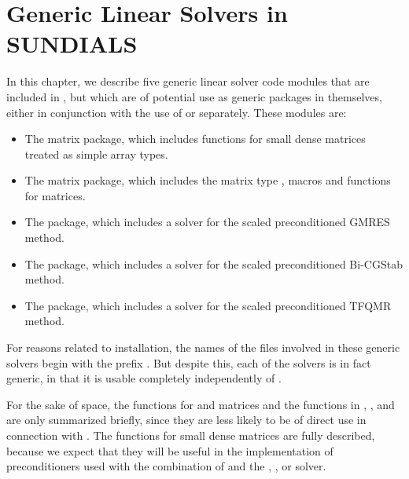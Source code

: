 \chapter{Generic Linear Solvers in SUNDIALS}\label{s:gen_linsolv}
In this chapter, we describe five generic linear solver code modules that 
are included in {\sundials}, but which are of potential use as generic packages in
themselves, either in conjunction with the use of {\kinsol} or separately.
These modules are:
\begin{itemize}
\item The {\dense} matrix package, which includes functions
      for small dense matrices treated as simple array types.
\item The {\band} matrix package, which includes the matrix type ,
      macros and functions for  matrices.
\item The {\spgmr} package, which includes a solver for the scaled
      preconditioned GMRES method.
\item The {\spbcg} package, which includes a solver for the scaled
      preconditioned Bi-CGStab method.
\item The {\sptfqmr} package, which includes a solver for the scaled
      preconditioned TFQMR method.
\end{itemize}

For reasons related to installation, the names of the files involved
in these generic solvers begin with the prefix .  But
despite this, each of the solvers is in fact generic, in that it is
usable completely independently of {\sundials}.

For the sake of space, the functions for  and
 matrices and the functions in {\spgmr}, {\spbcg}, and {\sptfqmr}
are only summarized briefly, since they are less likely to be of direct use
in connection with {\kinsol}.  The functions for small dense matrices are fully
described, because we expect that they will be useful in the
implementation of preconditioners used with the combination of {\kinsol}
and the {\kinspgmr}, {\kinspbcg}, or {\kinsptfqmr} solver.








